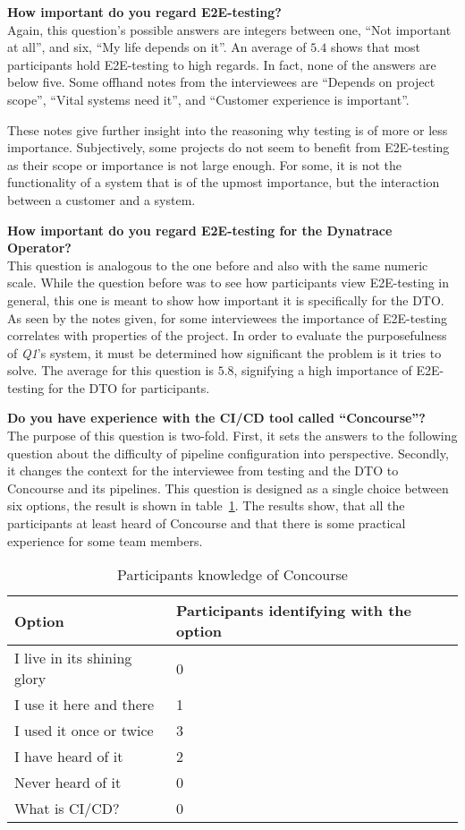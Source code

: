 \textbf{How important do you regard E2E-testing?}\\
Again, this question's possible answers are integers between one, ``Not important at all'', and six, ``My life depends on it''.
An average of $5.4$ shows that most participants hold E2E-testing to high regards.
In fact, none of the answers are below five.
Some offhand notes from the interviewees are ``Depends on project scope'', ``Vital systems need it'', and ``Customer experience is important''.

These notes give further insight into the reasoning why testing is of more or less importance.
Subjectively, some projects do not seem to benefit from E2E-testing as their scope or importance is not large enough.
For some, it is not the functionality of a system that is of the upmost importance, but the interaction between a customer and a system.

\textbf{How important do you regard E2E-testing for the Dynatrace Operator?}\\
This question is analogous to the one before and also with the same numeric scale.
While the question before was to see how participants view E2E-testing in general, this one is meant to show how important it is specifically for the DTO.
As seen by the notes given, for some interviewees the importance of E2E-testing correlates with properties of the project.
In order to evaluate the purposefulness of \textit{Q1}'s system, it must be determined how significant the problem is it tries to solve.
The average for this question is $5.8$, signifying a high importance of E2E-testing for the DTO for participants.

\textbf{Do you have experience with the CI/CD tool called ``Concourse''?}\\
The purpose of this question is two-fold.
First, it sets the answers to the following question about the difficulty of pipeline configuration into perspective.
Secondly, it changes the context for the interviewee from testing and the DTO to Concourse and its pipelines.
This question is designed as a single choice between six options, the result is shown in table\ \ref{tab:participants-knowledge-of-concourse}.
The results show, that all the participants at least heard of Concourse and that there is some practical experience for some team members.

\begin{table}[H]
    \centering
    \caption{Participants knowledge of Concourse}
    \label{tab:participants-knowledge-of-concourse}
    \begin{tabular}{l|l}
        Option & Participants identifying with the option \\
        \hline
        I live in its shining glory & 0 \\
        I use it here and there & 1 \\
        I used it once or twice & 3 \\
        I have heard of it & 2 \\
        Never heard of it & 0 \\
        What is CI/CD? & 0 \\
    \end{tabular}
\end{table}


